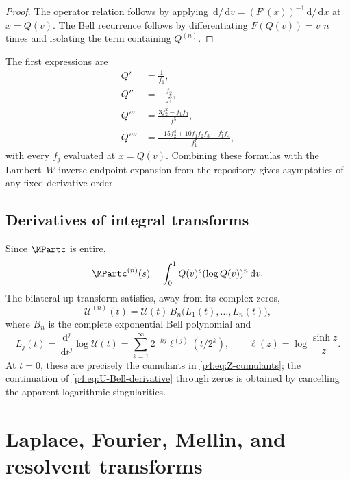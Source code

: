 \documentclass[11pt,oneside]{article}
\theoremstyle{definition}
\theoremstyle{remark}
\newcommand{\F}{F}
\newcommand{\Q}{Q}
\newcommand{\dd}{\,\mathrm d}
\newcommand{\1}{\mathbf 1}
\begin{document}
\begin{proof}
The operator relation follows by applying \(\dd/\dd v=(\F'(x))^{-1}\dd/\dd x\) at
\(x=\Q(v)\).  The Bell recurrence follows by differentiating
\(\F(\Q(v))=v\) \(n\) times and isolating the term containing \(\Q^{(n)}\).
\end{proof}

The first expressions are
\begin{align}
 \Q'&=\frac1{f_1},\nonumber\\
 \Q''&=-\frac{f_2}{f_1^3},\nonumber\\
 \Q'''&=\frac{3f_2^2-f_1f_3}{f_1^5},\nonumber\\
 \Q''''&=\frac{-15f_2^3+10f_1f_2f_3-f_1^2f_4}{f_1^7},
 \label{p4:eq:Q-first-derivatives}
\end{align}
with every \(f_j\) evaluated at \(x=\Q(v)\).  Combining these formulas with the
Lambert--\(W\) inverse endpoint expansion from the repository gives asymptotics of any
fixed derivative order.

\subsection{Derivatives of integral transforms}

Since \(\MPartc\) is entire,
\begin{equation}\label{p4:eq:M-nth-derivative}
 \MPartc^{(n)}(s)=\int_0^1\Q(v)^s(\log\Q(v))^n\dd v.
\end{equation}
The bilateral up transform satisfies, away from its complex zeros,
\begin{equation}\label{p4:eq:U-Bell-derivative}
 \mathcal U^{(n)}(t)
 =\mathcal U(t)\,
 B_n\bigl(L_1(t),\ldots,L_n(t)\bigr),
\end{equation}
where \(B_n\) is the complete exponential Bell polynomial and
\begin{equation}\label{p4:eq:Lj-def}
 L_j(t)=\frac{\dd^j}{\dd t^j}\log\mathcal U(t)
 =\sum_{k=1}^{\infty}2^{-kj}
 \ell^{(j)}(t/2^k),
 \qquad \ell(z)=\log\frac{\sinh z}{z}.
\end{equation}
At \(t=0\), these are precisely the cumulants in \cref{p4:eq:Z-cumulants}; the
continuation of \cref{p4:eq:U-Bell-derivative} through zeros is obtained by cancelling the
apparent logarithmic singularities.

\section{Laplace, Fourier, Mellin, and resolvent transforms}
\end{document}
